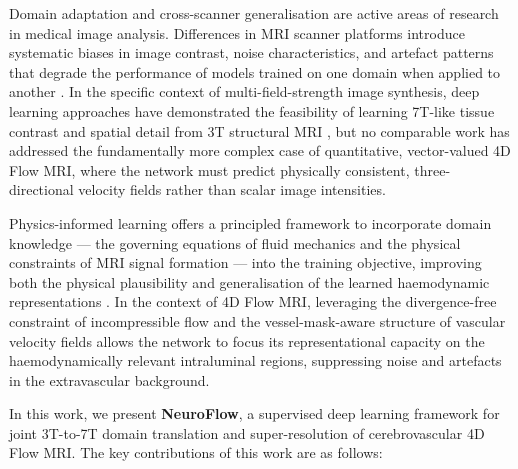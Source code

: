 Domain adaptation and cross-scanner generalisation are active areas of research in medical image analysis. Differences in MRI scanner platforms introduce systematic biases in image contrast, noise characteristics, and artefact patterns that degrade the performance of models trained on one domain when applied to another \cite{glocker2023domain,perone2019transductive}. In the specific context of multi-field-strength image synthesis, deep learning approaches have demonstrated the feasibility of learning 7T-like tissue contrast and spatial detail from 3T structural MRI \cite{qu2020synth7t,cui2024synth7t}, but no comparable work has addressed the fundamentally more complex case of quantitative, vector-valued 4D Flow MRI, where the network must predict physically consistent, three-directional velocity fields rather than scalar image intensities.

Physics-informed learning offers a principled framework to incorporate domain knowledge --- the governing equations of fluid mechanics and the physical constraints of MRI signal formation --- into the training objective, improving both the physical plausibility and generalisation of the learned haemodynamic representations \cite{kissas2020,ayed2023piml}. In the context of 4D Flow MRI, leveraging the divergence-free constraint of incompressible flow and the vessel-mask-aware structure of vascular velocity fields allows the network to focus its representational capacity on the haemodynamically relevant intraluminal regions, suppressing noise and artefacts in the extravascular background.

In this work, we present \textbf{NeuroFlow}, a supervised deep learning framework for joint 3T-to-7T domain translation and super-resolution of cerebrovascular 4D Flow MRI. The key contributions of this work are as follows:

